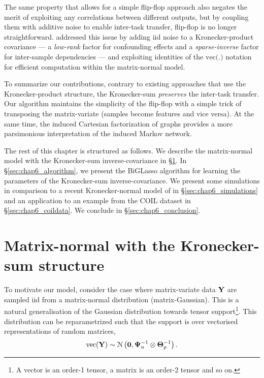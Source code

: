     The same property that allows for a simple flip-flop approach also negates the merit of exploiting any correlations between different outputs, but by coupling them with additive noise to enable inter-task transfer, flip-flop is no longer straightforward.
    \citet{stegle:efficient11} addressed this issue by adding iid noise to a Kronecker-product covariance --- a \emph{low-rank} factor for confounding effects and a \emph{sparse-inverse} factor for inter-sample dependencies --- and exploiting identities of the $\textrm{vec(.)}$ notation for efficient computation within the matrix-normal model.

    To summarize our contributions, contrary to existing approaches that use the Kronecker-product structure, the Kronecker-sum \emph{preserves} the inter-task transfer.
    Our algorithm maintains the simplicity of the flip-flop with a simple trick of transposing the matrix-variate (samples become features and vice versa).
    At the same time, the induced Cartesian factorization of graphs provides a more parsimonious interpretation of the induced Markov network.

    The rest of this chapter is structured as follows. We describe the matrix-normal model with the Kronecker-sum inverse-covariance in \S \ref{sec:chap6_model}.
    In \S \ref{sec:chap6_algorithm}, we present the BiGLasso algorithm for learning the parameters of the Kronecker-sum inverse-covariance.
    We present some simulations in comparison to a recent Kronecker-normal model of \citet[SMGM,][]{Leng:Sparse12} in \S \ref{sec:chap6_simulations} and an application to an example from the COIL dataset in \S \ref{sec:chap6_coildata}.
    We conclude in \S \ref{sec:chap6_conclusion}.
    



  \section{Matrix-normal with the Kronecker-sum structure} \label{sec:chap6_model}
  
    {\color{black} To motivate our model, consider the case where matrix-variate data $\mathbf{Y}$ are sampled iid from a matrix-normal distribution (matrix-Gaussian).
    This is a natural generalisation of the Gaussian distribution towards tensor support\footnote{A vector is an order-1 tensor, a matrix is an order-2 tensor and so on.}. This distribution can be reparametrized such that the support is over vectorised representations of random matrices, }
    \begin{equation*}
      \textrm{vec}(\mathbf{Y}) \sim \mathcal{N} \left( \mathbf{0}, \mathbf{\Psi}^{-1}_n \otimes \mathbf{\Theta}^{-1}_p \right).
    \end{equation*}
    
